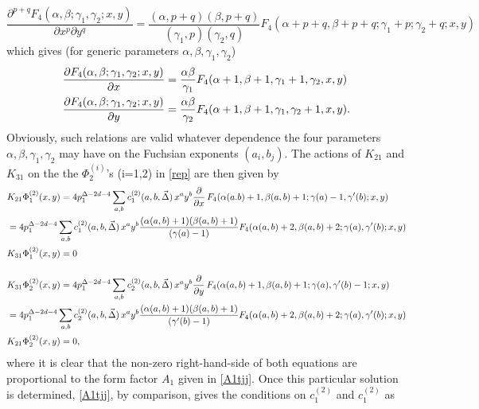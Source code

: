 \documentclass[a4paper,11pt,openright,twoside]{book}
\numberwithin{equation}{section}
\begin{document}
{{{\begin{equation}
	\frac{\partial^{p+q} F_4(\alpha,\beta;\gamma_1,\gamma_2;x,y)}{\partial x^p\partial y^q} =\frac{(\alpha,p+q)(\beta,p+q)}{(\gamma_1,p)(\gamma_2,q)}
	F_4(\alpha + p + q,\beta + p + q; \gamma_1 + p ; \gamma_2 + q;x,y)
\end{equation}
which gives (for generic parameters $\alpha,\beta,\gamma_1,\gamma_2$)
\begin{align}
	& \frac{\partial F_4(\alpha,\beta;\gamma_1,\gamma_2;x,y)}{\partial x} =\frac{\alpha \beta}{\gamma_1}F_4(\alpha+1,\beta+1,\gamma_1+1,\gamma_2,x,y) \notag\\
	&  \frac{\partial F_4(\alpha,\beta;\gamma_1,\gamma_2;x,y)}{\partial y} =\frac{\alpha \beta}{\gamma_2}F_4(\alpha+1,\beta+1,\gamma_1,\gamma_2 +1,x,y).
\end{align} 
Obviously, such relations are valid whatever dependence the four parameters $\alpha,\beta,\gamma_1,\gamma_2$ may have on 
the Fuchsian exponents $(a_i,b_j)$. 
The actions of $K_{21}$ and $K_{31}$ on the the $\Phi_2^{(i)}$'s (i=1,2)  in \eqref{rep} are then given by 
\begin{align}
	&K_{21}\Phi_1^{(2)}(x,y) = 4p_1^{\Delta-2 d -4} \sum_{a,b} c^{(2)}_1(a,b,\vec{\Delta})\,x^a y^b \frac{\partial}{\partial x} \,F_4(\alpha(a.b) +1, \beta(a,b)+1; \gamma(a)-1, \gamma'(b) ; x, y)   \notag\\
	&= 4 p_1^{\Delta-2 d -4} \sum_{a,b} c^{(2)}_1(a,b,\vec{\Delta})\,x^a y^b \frac{(\alpha(a,b)+1)(\beta(a,b)+1)}{(\gamma(a)-1)}F_4(\alpha(a,b) +2, \beta(a,b)+2; \gamma(a), \gamma'(b); x, y) \notag\\
	&K_{31}\Phi_1^{(2)}(x,y)= 0\\[3ex]
	&K_{31}\Phi_2^{(2)}(x,y) = 4 p_1^{\Delta-2 d -4} \sum_{a,b} c^{(2)}_2(a,b,\vec{\Delta})\, x^a y^b \frac{\partial}{\partial y} \,F_4(\alpha(a,b) +1, \beta(a,b)+1; \gamma(a), \gamma'(b)-1 ; x, y) \notag\\
	&=4 p_1^{\Delta-2 d -4} \sum_{a,b} c^{(2)}_2(a,b,\vec{\Delta})\,  x^a y^b  \frac{(\alpha(a,b)+1)(\beta(a,b)+1)}{(\gamma'(b)-1)} F_4(\alpha(a,b) +2, \beta(a,b)+2; \gamma(a), \gamma'(b); x, y)
	\notag\\
	&K_{21} \Phi_2^{(2)}(x,y)=0,
\end{align}
where it is clear that the non-zero right-hand-side of both equations are proportional to the form factor $A_1$ given in \eqref{A1tjj}. Once this particular solution is determined,  \eqref{A1tjj}, by comparison, gives the conditions on $c_1^{(2)}$ and $c_1^{(2)}$ as
\begin{equation}

\end{equation}}}}
\end{document}

